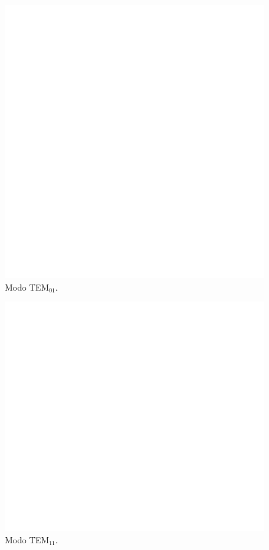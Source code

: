\documentclass[10pt, a4paper]{article}%
\begin{document}
\begin{multicols}{2}
\begin{figure}[H]
    \centering
    \includegraphics[scale=0.23]{Graficos/tem01.png}
    \caption{Modo TEM$_{01}$.}
    \label{fig:modo_tem01}
\end{figure}    

\begin{figure}[H]
    \centering    
    \includegraphics[scale=0.23]{Graficos/tem11.png}
    \caption{Modo TEM$_{11}$.}
    \label{fig:modo_tem11}
\end{figure}


\end{multicols}
\end{document}
